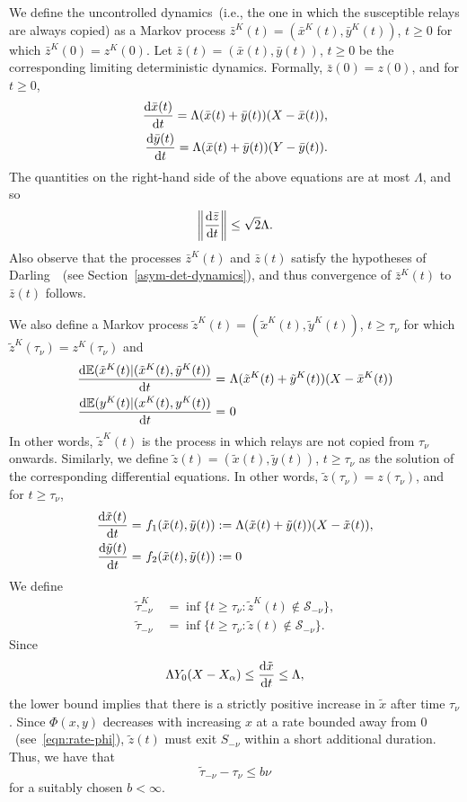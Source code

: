 \documentclass[10pt,journal,letterpaper]{IEEEtran}
\begin{document}
We define the uncontrolled dynamics~(i.e., the one in which the
susceptible relays are always copied) as a Markov process
$\bar{z}^K(t) = (\bar{x}^K(t),\bar{y}^K(t))$, $t \geq 0$ for which
$\bar{z}^K(0) = z^K(0)$. Let $\bar{z}(t) = (\bar{x}(t),\bar{y}(t))$,
$t \geq 0$ be the corresponding limiting deterministic dynamics.
Formally, $\bar{z}(0) = z(0)$, and for $t \geq 0$,
\begin{align*}
\frac{{\rm d}\bar{x}(t)}{{\rm d}t} = \Lambda (\bar{x}(t) + \bar{y}(t))(X-\bar{x}(t)), \\
\frac{{\rm d}\bar{y}(t)}{{\rm d}t} = \Lambda (\bar{x}(t) +
\bar{y}(t))(Y-\bar{y}(t)).
\end{align*}
The quantities on the right-hand side of the above equations are at
most $\Lambda$, and so
\[
\left \Vert \frac{{\rm d}\bar{z}}{{\rm d}t}\right \Vert \leq
\sqrt{2}\Lambda.
\]
Also observe that the processes $\bar{z}^K(t)$ and $\bar{z}(t)$
satisfy the hypotheses of Darling~\cite{stochproc.darling02fluid-limits}~(see Section~\ref{asym-det-dynamics}),
and thus convergence of $\bar{z}^K(t)$ to $\bar{z}(t)$ follows.


We also define a Markov process $\tilde{z}^K(t) =
(\tilde{x}^K(t),\tilde{y}^K(t))$, $t \geq \tau_{\nu}$ for which
$\tilde{z}^K(\tau_{\nu}) = z^K(\tau_{\nu})$ and
\begin{align*}
\frac{{\rm
d}\mathbb{E}(\tilde{x}^K(t)|(\tilde{x}^K(t),\tilde{y}^K(t))}{{\rm
d}t} =&~\Lambda (\tilde{x}^K(t) + \tilde{y}^K(t))(X-\bar{x}^K(t))\\
\frac{{\rm d}\mathbb{E}(y^K(t)|(x^K(t),y^K(t))}{{\rm d}t} = &~0 \\
\end{align*}
In other words, $\tilde{z}^K(t)$ is the process in which relays are
not copied from $\tau_{\nu}$ onwards. Similarly, we define
$\tilde{z}(t) = (\tilde{x}(t),\tilde{y}(t))$, $t \geq \tau_{\nu}$ as
the solution of the corresponding differential equations. In other
words, $\tilde{z}(\tau_{\nu}) = z(\tau_{\nu})$, and for $t \geq
\tau_{\nu}$,
\begin{align*}
\frac{{\rm d}\tilde{x}(t)}{{\rm d}t} = &~f_1(\tilde{x}(t),\tilde{y}(t)) := \Lambda (\tilde{x}(t) + \tilde{y}(t))(X-\tilde{x}(t)), \\
\frac{{\rm d}\tilde{y}(t)}{{\rm d}t} =
&~f_2(\tilde{x}(t),\tilde{y}(t)) := 0
\end{align*}
 We define
\begin{align*}
\tilde{\tau}^K_{-\nu} &~= \inf\{t \geq \tau_{\nu}: \tilde{z}^K(t)
\notin
\mathcal{S}_{-\nu}\},\\
\tilde{\tau}_{-\nu} &~= \inf\{t \geq \tau_{\nu}: \tilde{z}(t) \notin
\mathcal{S}_{-\nu}\}.
\end{align*}
Since
\[\Lambda Y_0(X-X_{\alpha}) \leq \frac{{\rm d}\tilde{x}}{{\rm d}t} \leq \Lambda,\]
the lower bound implies that there is a strictly positive increase
in $\tilde{x}$ after time $\tau_{\nu}$. Since $\Phi(x, y)$ decreases
with increasing $x$ at a rate bounded away from
$0$~(see~\ref{eqn:rate-phi}), $\tilde{z}(t)$ must exit $S_{-\nu}$
within a short additional duration. Thus, we have that
\[\tilde{\tau}_{-\nu} - \tau_{\nu} \leq b \nu\]
for a suitably chosen $b < \infty$.
\end{document}
